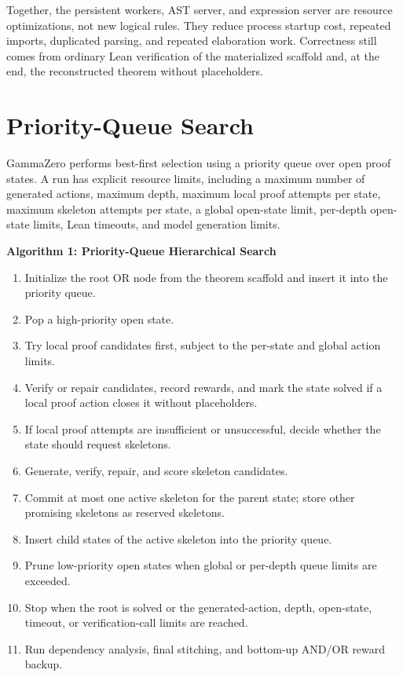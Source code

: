\documentclass[en]{uet_awesome_thesis/uet-awesome-thesis}
\begin{document}
Together, the persistent workers, AST server, and expression server are resource optimizations, not new
logical rules. They reduce process startup cost, repeated imports, duplicated parsing, and repeated
elaboration work. Correctness still comes from ordinary Lean verification of the materialized scaffold
and, at the end, the reconstructed theorem without placeholders.

\section{Priority-Queue Search}

GammaZero performs best-first selection using a priority queue over open proof states. A run has explicit resource limits, including a maximum number of generated actions, maximum depth, maximum local proof attempts per state, maximum skeleton attempts per state, a global open-state limit, per-depth open-state limits, Lean timeouts, and model generation limits.

\noindent\textbf{Algorithm 1: Priority-Queue Hierarchical Search}
\begin{enumerate}[leftmargin=*]
    \item Initialize the root OR node from the theorem scaffold and insert it into the priority queue.
    \item Pop a high-priority open state.
    \item Try local proof candidates first, subject to the per-state and global action limits.
    \item Verify or repair candidates, record rewards, and mark the state solved if a local proof action closes it without placeholders.
    \item If local proof attempts are insufficient or unsuccessful, decide whether the state should request skeletons.
    \item Generate, verify, repair, and score skeleton candidates.
    \item Commit at most one active skeleton for the parent state; store other promising skeletons as reserved skeletons.
    \item Insert child states of the active skeleton into the priority queue.
    \item Prune low-priority open states when global or per-depth queue limits are exceeded.
    \item Stop when the root is solved or the generated-action, depth, open-state, timeout, or verification-call limits are reached.
    \item Run dependency analysis, final stitching, and bottom-up AND/OR reward backup.
\end{enumerate}
\end{document}
